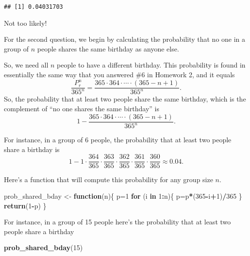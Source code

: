 \documentclass[
]{book}
\newenvironment{Shaded}{\begin{snugshade}}{\end{snugshade}}
\newcommand{\ControlFlowTok}[1]{\textcolor[rgb]{0.13,0.29,0.53}{\textbf{#1}}}
\newcommand{\DecValTok}[1]{\textcolor[rgb]{0.00,0.00,0.81}{#1}}
\newcommand{\FunctionTok}[1]{\textcolor[rgb]{0.13,0.29,0.53}{\textbf{#1}}}
\newcommand{\NormalTok}[1]{#1}
\newcommand{\OtherTok}[1]{\textcolor[rgb]{0.56,0.35,0.01}{#1}}
\newcommand{\SpecialCharTok}[1]{\textcolor[rgb]{0.81,0.36,0.00}{\textbf{#1}}}
\theoremstyle{definition}
\theoremstyle{definition}
\theoremstyle{definition}
\theoremstyle{definition}
\theoremstyle{remark}
\begin{document}
\begin{verbatim}
## [1] 0.04031703
\end{verbatim}

Not too likely!

For the second question, we begin by calculating the probability that no one in a group of \(n\) people shares the same birthday as anyone else.

So, we need all \(n\) people to have a different birthday. This probability is found in essentially the same way that you answered \#6 in Homework 2, and it equals
\[\frac{P^n_r}{365^n}=\frac{365\cdot 364 \cdot \cdots \cdot (365-n+1)}{365^n}.\]
So, the probability that at least two people share the same birthday, which is the complement of ``no one shares the same birthday'' is \[1 - \frac{365\cdot 364 \cdot \cdots \cdot (365-n+1)}{365^n}.\]

For instance, in a group of 6 people, the probability that at least two people share a birthday is \[1-1 \cdot \frac{364}{365}\cdot\frac{363}{365}\cdot \frac{362}{365}\cdot\frac{361}{365}\cdot\frac{360}{365}\approx0.04.\]

Here's a function that will compute this probability for any group size \(n\).

\begin{Shaded}
\begin{Highlighting}[]
\NormalTok{prob\_shared\_bday }\OtherTok{\textless{}{-}} \ControlFlowTok{function}\NormalTok{(n)\{}
\NormalTok{  p}\OtherTok{=}\DecValTok{1}
  \ControlFlowTok{for}\NormalTok{ (i }\ControlFlowTok{in} \DecValTok{1}\SpecialCharTok{:}\NormalTok{n)\{}
\NormalTok{    p}\OtherTok{=}\NormalTok{p}\SpecialCharTok{*}\NormalTok{(}\DecValTok{365}\SpecialCharTok{{-}}\NormalTok{i}\SpecialCharTok{+}\DecValTok{1}\NormalTok{)}\SpecialCharTok{/}\DecValTok{365}
\NormalTok{    \}}
  \FunctionTok{return}\NormalTok{(}\DecValTok{1}\SpecialCharTok{{-}}\NormalTok{p)}
\NormalTok{\}}
\end{Highlighting}
\end{Shaded}

For instance, in a group of 15 people here's the probability that at least two people share a birthday

\begin{Shaded}
\begin{Highlighting}[]
\FunctionTok{prob\_shared\_bday}\NormalTok{(}\DecValTok{15}\NormalTok{)}
\end{Highlighting}
\end{Shaded}
\end{document}
